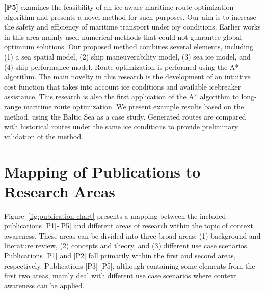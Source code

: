 \textbf{[P5]} examines the feasibility of an ice-aware maritime route optimization algorithm and presents a novel method for such purposes. Our aim is to increase the safety and efficiency of maritime transport under icy conditions. Earlier works in this area mainly used numerical methods that could not guarantee global optimium solutions. Our proposed method combines several elements, including (1) a sea spatial model, (2) ship maneuverability model, (3) sea ice model, and (4) ship performance model. Route optimization is performed using the A* algorithm. The main novelty in this research is the development of an intuitive cost function that takes into account ice conditions and available icebreaker assistance. This research is also the first application of the A* algorithm to long-range maritime route optimization. We present example results based on the method, using the Baltic Sea as a case study. Generated routes are compared with historical routes under the same ice conditions to provide preliminary validation of the method.

\section{Mapping of Publications to Research Areas}
\label{sec:relating_to_research}

Figure~\ref{fig:publication-chart} presents a mapping between the included publications [P1]-[P5] and different areas of research within the topic of context awareness. These areas can be divided into three broad areas: (1) background and literature review, (2) concepts and theory, and (3) different use case scenarios. Publications [P1] and [P2] fall primarily within the first and second areas, respectively. Publications [P3]-[P5], although containing some elements from the first two areas, mainly deal with different use case scenarios where context awareness can be applied.

